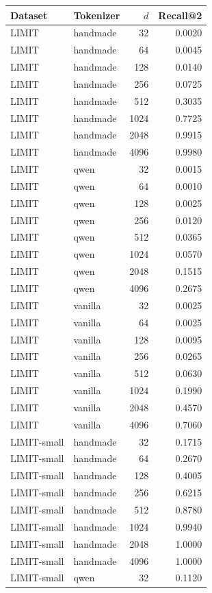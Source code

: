 \begin{tabular}{llrr}
\toprule
Dataset & Tokenizer & $d$ & Recall@2 \\
\midrule
LIMIT & handmade & 32 & 0.0020 \\
LIMIT & handmade & 64 & 0.0045 \\
LIMIT & handmade & 128 & 0.0140 \\
LIMIT & handmade & 256 & 0.0725 \\
LIMIT & handmade & 512 & 0.3035 \\
LIMIT & handmade & 1024 & 0.7725 \\
LIMIT & handmade & 2048 & 0.9915 \\
LIMIT & handmade & 4096 & 0.9980 \\
LIMIT & qwen & 32 & 0.0015 \\
LIMIT & qwen & 64 & 0.0010 \\
LIMIT & qwen & 128 & 0.0025 \\
LIMIT & qwen & 256 & 0.0120 \\
LIMIT & qwen & 512 & 0.0365 \\
LIMIT & qwen & 1024 & 0.0570 \\
LIMIT & qwen & 2048 & 0.1515 \\
LIMIT & qwen & 4096 & 0.2675 \\
LIMIT & vanilla & 32 & 0.0025 \\
LIMIT & vanilla & 64 & 0.0025 \\
LIMIT & vanilla & 128 & 0.0095 \\
LIMIT & vanilla & 256 & 0.0265 \\
LIMIT & vanilla & 512 & 0.0630 \\
LIMIT & vanilla & 1024 & 0.1990 \\
LIMIT & vanilla & 2048 & 0.4570 \\
LIMIT & vanilla & 4096 & 0.7060 \\
LIMIT-small & handmade & 32 & 0.1715 \\
LIMIT-small & handmade & 64 & 0.2670 \\
LIMIT-small & handmade & 128 & 0.4005 \\
LIMIT-small & handmade & 256 & 0.6215 \\
LIMIT-small & handmade & 512 & 0.8780 \\
LIMIT-small & handmade & 1024 & 0.9940 \\
LIMIT-small & handmade & 2048 & 1.0000 \\
LIMIT-small & handmade & 4096 & 1.0000 \\
LIMIT-small & qwen & 32 & 0.1120 \\

\end{tabular}
